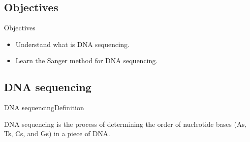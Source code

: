 \documentclass[10pt]{beamer}
\newcommand{\1}{
	\setbeamertemplate{background}{
		\texttt{[image: img/1]}
		\tikz[overlay] \fill[fill opacity=0.75,fill=white] (0,0) rectangle (-\paperwidth,\paperheight);
	}
}
\begin{document}
\subsection{Objectives}

\begin{frame}{Objectives}{}
\begin{itemize}
    \item<1-> Understand what is DNA sequencing. 
    \item<2-> Learn the Sanger method for DNA sequencing.
  \end{itemize}
\end{frame}

\subsection{DNA sequencing}



\begin{frame}{DNA sequencing}{Definition}
	
	\begin{block}{}
		DNA sequencing is the process of determining the order of nucleotide bases (As, Ts, Cs, and Gs) in a piece of DNA.
	\end{block}
	
\end{frame}
\end{document}
